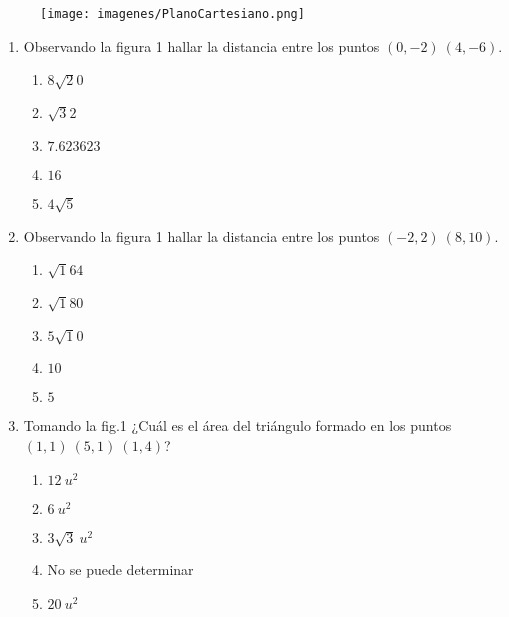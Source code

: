 \documentclass[12pt]{article}
\begin{document}

\begin{figure}[h]
\centering
\texttt{[image: imagenes/PlanoCartesiano.png]} 
\caption{}
\label{etiqueta}
\end{figure}
\begin{enumerate} %

\item  Observando la figura 1 hallar la distancia entre los puntos $(0,-2) \ (4,-6)$.

\begin{enumerate}
    \item $8{\sqrt 20}$
    \item ${\sqrt 32}$  
    \item $ 7.623623 $
    \item $ 16$ 
    \item $4{\sqrt 5}$
    \end{enumerate}
    
\item  Observando la figura 1 hallar la distancia entre los puntos $(-2,2) \ (8,10)$.

\begin{enumerate}
    \item $ \sqrt 164$
    \item $ \sqrt 180 $  
    \item $ 5 \sqrt 10 $
    \item $ 10 $ 
    \item $ 5 $
    \end{enumerate}

\item  Tomando la fig.1 ¿Cuál es el área del triángulo formado en los puntos \\ $(1,1) \ (5,1) \ (1,4)$?
\begin{enumerate}
    \item $ 12 \ u^2 $
    \item $ 6 \ u^2 $  
    \item $ 3 \sqrt 3 \ u^2 $
    \item  No se puede determinar  
    \item $ 20 \ u^2 $
    \end{enumerate}


\end{enumerate}
\end{document}
